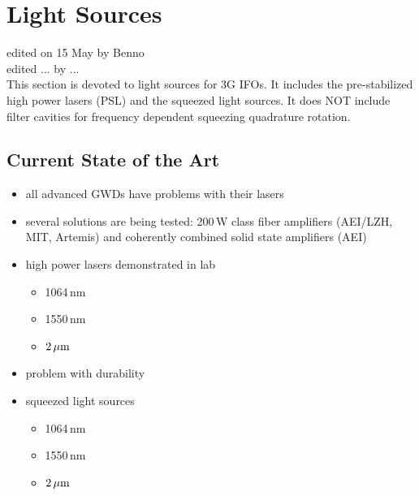 \section{Light Sources}
{\color{blue} edited on 15 May by Benno\\
edited ... by ...}\\
This section is devoted to light sources for 3G IFOs. It includes the pre-stabilized high power lasers (PSL) and the squeezed light sources. It does NOT include filter cavities for frequency dependent squeezing quadrature rotation. 
\subsection{Current State of the Art}
\begin{itemize}
\item all advanced GWDs have problems with their lasers
\item several solutions are being tested: 200\,W class fiber amplifiers (AEI/LZH, MIT, Artemis) and coherently combined solid state amplifiers (AEI)
\item high power lasers demonstrated in lab
	\begin{itemize}
    \item 1064\,nm
    \item 1550\,nm
    \item $\rm 2\,\mu m$
	\end{itemize}
\item problem with durability
\item squeezed light sources 
\begin{itemize}
    \item 1064\,nm
    \item 1550\,nm
    \item $\rm 2\,\mu m$
	\end{itemize}
\end{itemize}


